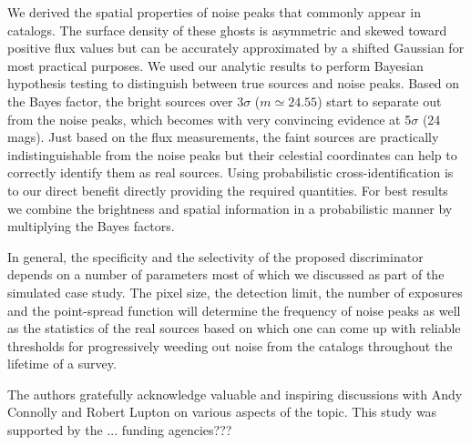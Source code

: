 \documentclass[twocolumn]{emulateapj}
\begin{document}
We derived the spatial properties of noise peaks that commonly appear in catalogs. The surface density of these ghosts is asymmetric and skewed toward positive flux values but can be accurately approximated by a shifted Gaussian for most practical purposes. We used our analytic results to perform Bayesian hypothesis testing to distinguish between true sources and noise peaks.
%
Based on the Bayes factor, the bright sources over \mbox{3$\sigma$} \mbox{($m\!\simeq\!24.55$)} start to separate out from the noise peaks, which becomes with very convincing evidence at \mbox{5$\sigma$} (24 mags).
%
Just based on the flux measurements, the faint sources are practically indistinguishable from the noise peaks but their celestial coordinates can help to correctly identify them as real sources. Using probabilistic cross-identification is to our direct benefit directly providing the required quantities. For best results we combine the brightness and spatial information in a probabilistic manner by multiplying the Bayes factors.

In general, the specificity and the selectivity of the proposed discriminator depends on a number of parameters most of which we discussed as part of the simulated case study. The pixel size, the detection limit, the number of exposures and the point-spread function will determine the frequency of noise peaks as well as the statistics of the real sources based on which one can come up with reliable thresholds for progressively weeding out noise from the catalogs throughout the lifetime of a survey.


\acknowledgements{}
The authors gratefully acknowledge valuable and inspiring discussions with Andy Connolly and Robert Lupton on various aspects of the topic. This study was supported by the ... {\color{red}funding agencies???}

\color{black}
\end{document}
